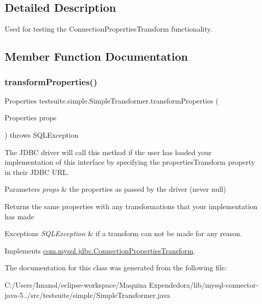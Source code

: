 \subsection{Detailed Description}
Used for testing the Connection\+Properties\+Transform functionality. 

\subsection{Member Function Documentation}
\mbox{\label{classtestsuite_1_1simple_1_1_simple_transformer_aadfc91d352f3a7b94257f30b319cb258}} 
\subsubsection{\texorpdfstring{transform\+Properties()}{transformProperties()}}
{\footnotesize\ttfamily Properties testsuite.\+simple.\+Simple\+Transformer.\+transform\+Properties (\begin{DoxyParamCaption}\item[{Properties}]{props }\end{DoxyParamCaption}) throws S\+Q\+L\+Exception}

The J\+D\+BC driver will call this method if the user has loaded your implementation of this interface by specifying the \textquotesingle{}properties\+Transform\textquotesingle{} property in their J\+D\+BC U\+RL.


\begin{DoxyParams}{Parameters}
{\em props} & the properties as passed by the driver (never null)\\
\hline
\end{DoxyParams}
\begin{DoxyReturn}{Returns}
the same properties with any transformations that your implementation has made
\end{DoxyReturn}

\begin{DoxyExceptions}{Exceptions}
{\em S\+Q\+L\+Exception} & if a transform can not be made for any reason. \\
\hline
\end{DoxyExceptions}


Implements \mbox{\hyperlink{interfacecom_1_1mysql_1_1jdbc_1_1_connection_properties_transform_a044765ce0ad5bcba0276eac61fe8e04d}{com.\+mysql.\+jdbc.\+Connection\+Properties\+Transform}}.



The documentation for this class was generated from the following file\+:\begin{DoxyCompactItemize}
\item 
C\+:/\+Users/\+Imanol/eclipse-\/workspace/\+Maquina Expendedora/lib/mysql-\/connector-\/java-\/5../src/testsuite/simple/Simple\+Transformer.\+java\end{DoxyCompactItemize}
